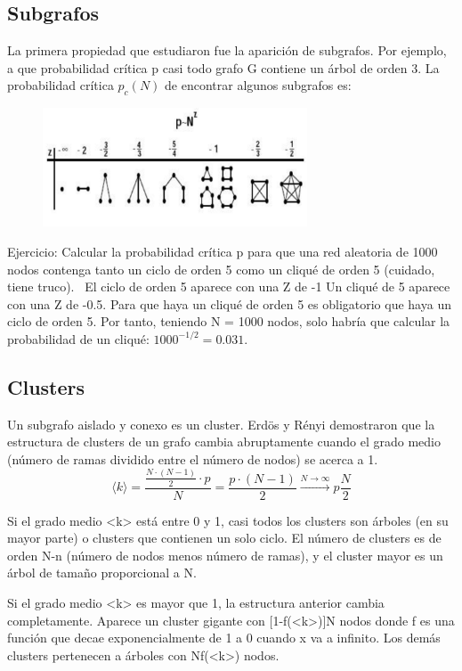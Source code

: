 \subsection{Subgrafos}
La primera propiedad que estudiaron fue la aparición de subgrafos. Por ejemplo, a que probabilidad crítica p casi todo grafo G contiene un árbol de orden 3. 
La probabilidad crítica $p_c(N)$ de encontrar algunos subgrafos es:
\begin{figure}
\centering
\includegraphics[width = 0.7\textwidth]{figs/prob-critica.png}
\end{figure}

Ejercicio: Calcular la probabilidad crítica p para que una red aleatoria de 1000 nodos contenga tanto un ciclo de orden 5 como un cliqué de orden 5 (cuidado, tiene truco).
 \
El ciclo de orden 5 aparece con una Z de -1
Un cliqué de 5 aparece con una Z de -0.5. 
Para que haya un cliqué de orden 5 es obligatorio que haya un ciclo de orden 5. Por tanto, teniendo N = 1000 nodos, solo habría que calcular la probabilidad de un cliqué: $1000^{-1/2} = 0.031$.

\subsection{Clusters}
Un subgrafo aislado y conexo es un
cluster. Erdös y Rényi demostraron que la estructura de clusters de un grafo
cambia abruptamente cuando el grado medio (número de ramas dividido entre el número de nodos) se acerca a 1.
$$\langle k \rangle = \frac{\frac{N \cdot (N-1)}{2} \cdot p}{N} = \frac{p \cdot (N-1)}{2} \xrightarrow{N \to \infty} p\frac{N}{2}$$

Si el grado medio <k> está entre 0 y 1, casi todos los clusters son árboles (en su mayor parte) o clusters que contienen un solo ciclo. El número de clusters es de orden N-n (número de nodos menos número de ramas), y el cluster mayor es un árbol de tamaño proporcional a N. 

Si el grado medio <k> es mayor que 1, la estructura anterior cambia completamente. Aparece un cluster gigante con [1-f(<k>)]N nodos donde f es una función que decae exponencialmente de 1 a 0 cuando x va a infinito. Los demás clusters pertenecen a árboles con Nf(<k>) nodos.

